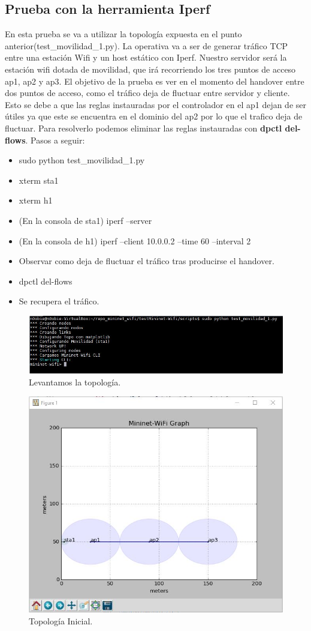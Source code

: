 \subsection{Prueba con la herramienta Iperf}
En esta prueba se va a utilizar la topología expuesta en el punto anterior(test\_movilidad\_1.py). La operativa va a ser de generar tráfico TCP  entre una estación Wifi y un host estático con Iperf. Nuestro servidor será la estación wifi dotada de movilidad, que irá recorriendo los tres puntos de acceso ap1, ap2  y ap3. \newline
\newline
El objetivo de la prueba es ver en el momento del handover entre dos puntos de acceso, como el tráfico deja de fluctuar entre servidor y cliente. Esto se debe a que las reglas instauradas por el controlador en el ap1 dejan de ser útiles ya que este se encuentra en el dominio del ap2 por lo que el trafico deja de fluctuar. Para resolverlo podemos eliminar las reglas instauradas con \textbf{dpctl del-flows}. Pasos a seguir:
\begin{itemize}
    \item sudo python test\_movilidad\_1.py
    \item xterm sta1
    \item xterm h1
    \item (En la consola de sta1) iperf --server
    \item (En la consola de h1) iperf --client 10.0.0.2 --time 60 --interval 2
    \item Observar como deja de fluctuar el tráfico tras producirse el handover.
    \item dpctl del-flows
    \item Se recupera el tráfico.
\end{itemize}
\newpage
\begin{figure}[!htb]
  \centering
    \includegraphics[width=0.8\linewidth]{./img/test/21.JPG}
    \caption{Levantamos la topología.}
  \label{fig:yo}
\end{figure}
\begin{figure}[!htb]
  \centering
    \includegraphics[width=0.6\linewidth]{./img/test/22.JPG}
    \caption{Topología Inicial.}
  \label{fig:yo}
\end{figure}
